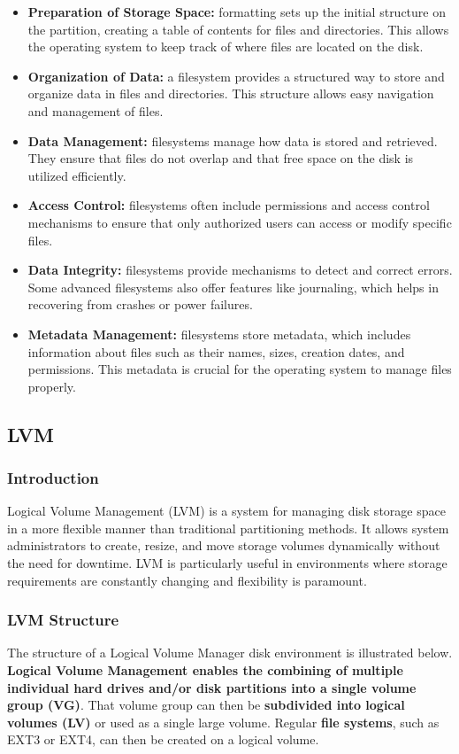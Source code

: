 \documentclass{article}
\begin{document}
\begin{itemize}
    \item \textbf{Preparation of Storage Space:} formatting sets up the initial structure on the partition, creating a table of contents for files and directories. This allows the operating system to keep track of where files are located on the disk.
    \item \textbf{Organization of Data:} a filesystem provides a structured way to store and organize data in files and directories. This structure allows easy navigation and management of files.
    \item \textbf{Data Management:} filesystems manage how data is stored and retrieved. They ensure that files do not overlap and that free space on the disk is utilized efficiently.
    \item \textbf{Access Control:} filesystems often include permissions and access control mechanisms to ensure that only authorized users can access or modify specific files.
    \item \textbf{Data Integrity:} filesystems provide mechanisms to detect and correct errors. Some advanced filesystems also offer features like journaling, which helps in recovering from crashes or power failures.
    \item \textbf{Metadata Management:} filesystems store metadata, which includes information about files such as their names, sizes, creation dates, and permissions. This metadata is crucial for the operating system to manage files properly.
\end{itemize}

\subsection{LVM}

\subsubsection{Introduction}
Logical Volume Management (LVM) is a system for managing disk storage space in a more flexible manner than traditional partitioning methods. It allows system administrators to create, resize, and move storage volumes dynamically without the need for downtime. LVM is particularly useful in environments where storage requirements are constantly changing and flexibility is paramount.

\subsubsection{LVM Structure}
The structure of a Logical Volume Manager disk environment is illustrated below. \textbf{Logical Volume Management enables the combining of multiple individual hard drives and/or disk partitions into a single volume group (VG)}. That volume group can then be \textbf{subdivided into logical volumes (LV)} or used as a single large volume. Regular \textbf{file systems}, such as EXT3 or EXT4, can then be created on a logical volume.
\end{document}
